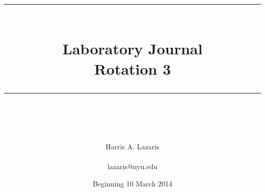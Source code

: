 \documentclass[idxtotoc,hyperref,openany]{labbook} %
\newcommand{\HRule}{\rule{\linewidth}{0.5mm}} %
\begin{document}

\frontmatter %
\title{
\begin{center}
\HRule \\[0.4cm]
{\Huge \bfseries Laboratory Journal \\[0.5cm] \Large Rotation 3}\\[0.4cm] %
\HRule \\[1.5cm]
\end{center}
}
\author{\Huge Harris A. Lazaris \\ \\ \LARGE lazaris@nyu.edu \\[2cm]} %
\date{Beginning 10 March 2014} %
\maketitle

\tableofcontents

\mainmatter %















\end{document}
